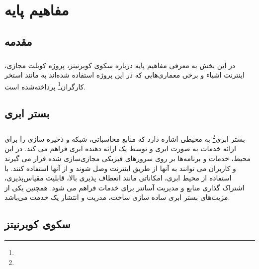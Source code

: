 
\chapter{مفاهیم پایه} \label{ch:basics}
\thispagestyle{empty}


\section{مقدمه}
\paragraph{}
{
    در این بخش به معرفی مفاهیم پایه درباره سکوی کوبرنیتز، پروژه کوبلت مجازی، اینترنت اشیاء و برخی معماری‌هایی که 
    در این پروژه استفاده شده‌اند به مانند 
    استخر کارگران\footnote{}
    پرداخته‌شده است.
}

\section{بستر ابری}
\label{sec:cloudenv}
\paragraph{}
{
    بستر ابری\footnote{}
    به محیطی اشاره دارد که منابع محاسباتی، شبکه و ذخیره سازی را برای ارائه خدمات به صورت ابری و توسط یک ارائه دهنده ابری فراهم می کند.
    در این محیط، خدمات و برنامه‌ها بر روی سرورهای فیزیکی مجازی‌سازی شده قرار می گیرند و کاربران می توانند به آنها از طریق اینترنت وصل شوند
    و از آنها استفاده کنند. با استفاده از محیط ابری، امکاناتی مانند انعطاف پذیری بالا، قابلیت مقیاس‌پذیری، اشتراک گذاری منابع و مدیریت
    آسانتر برای خدمات فراهم می شود. همچنین یکی از مزیت‌های بستر ابری ساده سازی ساخت، مدریت و انتشار یک خدمت می‌باشد.
}

\section{سکوی کوبرنیتز}
\label{sec:kubernetes}
